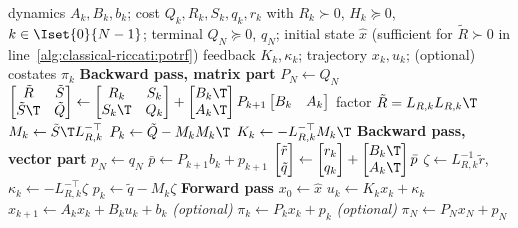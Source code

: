 \begin{algorithm}[H]
\caption{Classical Riccati recursion}
\label{alg:classical-riccati}
\begin{algorithmic}[1]
\Require dynamics $A_k, B_k, b_k$; cost $Q_k, R_k, S_k, q_k, r_k$ with $R_k \succ 0$, $H_k \succeq 0$, $k \in \Iset{0}{N-1}$;
         terminal $Q_N \succeq 0$, $q_N$; initial state $\hat{x}$
         (sufficient for $\tilde{R} \succ 0$ in line~\ref{alg:classical-riccati:potrf})
\Ensure feedback $K_k, \kappa_k$; trajectory $x_k, u_k$; (optional) costates $\pi_k$
\Statex \textbf{Backward pass, matrix part}
\State $P_N \gets Q_N$
\State $\begin{bmatrix} \tilde{R} & \tilde{S} \\ \tilde{S}\T & \tilde{Q} \end{bmatrix} \gets
\begin{bmatrix} R_k & S_k \\ S_k\T & Q_k \end{bmatrix}
+ \begin{bmatrix} B_k\T \\ A_k\T \end{bmatrix} P_{k+1} \begin{bmatrix} B_k & A_k \end{bmatrix}$
\State factor $\tilde{R} = L_{R,k} L_{R,k}\T$
\label{alg:classical-riccati:potrf}
\State $M_k \gets \tilde{S}\T L_{R,k}^{-\top}$
\State $P_k \gets \tilde{Q} - M_k M_k\T$
\State $K_k \gets -L_{R,k}^{-\top} M_k\T$
\EndFor
\Statex \textbf{Backward pass, vector part}
\State $p_N \gets q_N$
\State $\bar{p} \gets P_{k+1} b_k + p_{k+1}$
\State $\begin{bmatrix} \tilde r \\ \tilde q \end{bmatrix} \gets
\begin{bmatrix} r_k \\ q_k \end{bmatrix}
+ \begin{bmatrix} B_k\T \\ A_k\T \end{bmatrix} \bar{p}$
\State $\zeta \gets L_{R,k}^{-1}\tilde r$,\quad $\kappa_k \gets -L_{R,k}^{-\top} \zeta$
\State $p_k \gets \tilde q - M_k\zeta$
\EndFor
\Statex \textbf{Forward pass}
\State $x_0 \gets \hat{x}$
\State $u_k \gets K_k x_k + \kappa_k$
\State $x_{k+1} \gets A_k x_k + B_k u_k + b_k$
\State \textit{(optional)}\; $\pi_k \gets P_k x_k + p_k$
\EndFor
\State \textit{(optional)}\; $\pi_N \gets P_N x_N + p_N$
\end{algorithmic}
\end{algorithm}

